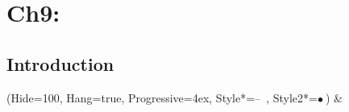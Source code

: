 \documentclass[11pt, oneside]{article}
\begin{document}
\section{Ch9: }
\subsection{Introduction}
    \begin{easylist}  
    \ListProperties(Hide=100, Hang=true, Progressive=4ex, Style*=--\ , Style2*=$\bullet\ $)
        & 
    \end{easylist}
\clearpage
\end{document}
